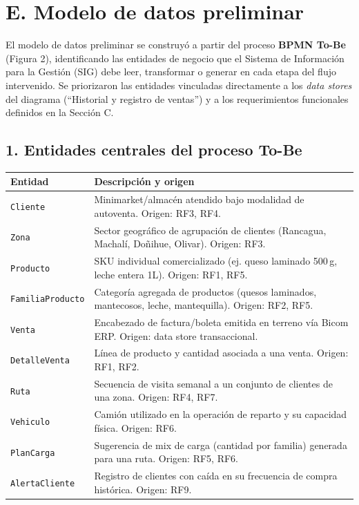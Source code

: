 \documentclass[10pt,a4paper]{article}
\begin{document}
\section*{E. Modelo de datos preliminar}


El modelo de datos preliminar se construyó a partir del proceso \textbf{BPMN To-Be} 
(Figura 2), identificando las entidades de negocio que el Sistema de Información
para la Gestión (SIG) debe leer, transformar o generar en cada etapa del flujo
intervenido. Se priorizaron las entidades vinculadas directamente a los
\textit{data stores} del diagrama (``Historial y registro de ventas'') y a los
requerimientos funcionales definidos en la Sección C.

\subsection*{1. Entidades centrales del proceso To-Be}

\vspace{0.15cm}
\begin{center}
\small
\renewcommand{\arraystretch}{1.2}
\begin{tabular}{|p{3.2cm}|p{11.5cm}|}
\hline
\textbf{Entidad} & \textbf{Descripción y origen} \\ \hline
\texttt{Cliente} & Minimarket/almacén atendido bajo modalidad de autoventa. Origen: RF3, RF4. \\ \hline
\texttt{Zona} & Sector geográfico de agrupación de clientes (Rancagua, Machalí, Doñihue, Olivar). Origen: RF3. \\ \hline
\texttt{Producto} & SKU individual comercializado (ej. queso laminado 500\,g, leche entera 1L). Origen: RF1, RF5. \\ \hline
\texttt{FamiliaProducto} & Categoría agregada de productos (quesos laminados, mantecosos, leche, mantequilla). Origen: RF2, RF5. \\ \hline
\texttt{Venta} & Encabezado de factura/boleta emitida en terreno vía Bicom ERP. Origen: data store transaccional. \\ \hline
\texttt{DetalleVenta} & Línea de producto y cantidad asociada a una venta. Origen: RF1, RF2. \\ \hline
\texttt{Ruta} & Secuencia de visita semanal a un conjunto de clientes de una zona. Origen: RF4, RF7. \\ \hline
\texttt{Vehiculo} & Camión utilizado en la operación de reparto y su capacidad física. Origen: RF6. \\ \hline
\texttt{PlanCarga} & Sugerencia de mix de carga (cantidad por familia) generada para una ruta. Origen: RF5, RF6. \\ \hline
\texttt{AlertaCliente} & Registro de clientes con caída en su frecuencia de compra histórica. Origen: RF9. \\ \hline
\end{tabular}
\end{center}
\vspace{0.2cm}
\end{document}
